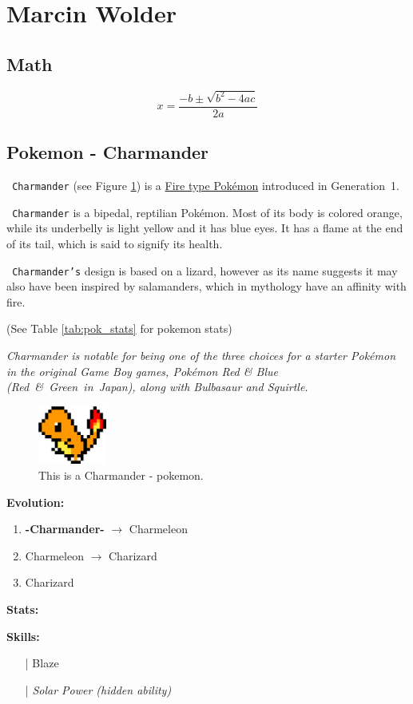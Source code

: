 \section{Marcin Wolder}
\label{sec:marwol}

\subsection{Math}
$${
x = \frac{-b\pm\sqrt{b^2-4ac}}{2a}
}$$

\subsection{Pokemon - Charmander}

\begin{flushleft}
\texttt{ Charmander} (see Figure \ref{fig:pokemon}) is a \underline{Fire type Pokémon} introduced in Generation~1.

\texttt{ Charmander} is a bipedal, reptilian Pokémon. Most of its body is colored orange, while its underbelly is light yellow and it has blue eyes. It has a flame at the end of its tail, which is said to signify its health.

\texttt{ Charmander's} design is based on a lizard, however as its name suggests it may also have been inspired by salamanders, which in mythology have an affinity with fire.

(See Table \ref{tab:pok_stats} for pokemon stats)
\end{flushleft}

\begin{flushright}
\textit{
Charmander is notable for being one of the three choices for a starter Pokémon in the original Game Boy games, Pokémon Red \& Blue (Red~\&~Green~in~Japan), along with Bulbasaur and Squirtle.}  
\end{flushright}

\begin{figure}[htbp]
    \centering
    \includegraphics[width=0.2\textwidth]{pictures/pokemon.png} 
    \caption{This is a Charmander - pokemon.}
    \label{fig:pokemon}
\end{figure}

{\large\textbf{Evolution:}}
\begin{enumerate}
    \item {\textbf{-Charmander-}} $\to$ Charmeleon
    \item Charmeleon $\to$ Charizard
    \item Charizard
\end{enumerate}

{\large\textbf{Stats:}}


{\large\textbf{Skills:}}
\begin{itemize}
    \item[|] Blaze
    \item[|] {\small \textit{Solar Power (hidden ability)}}
\end{itemize}